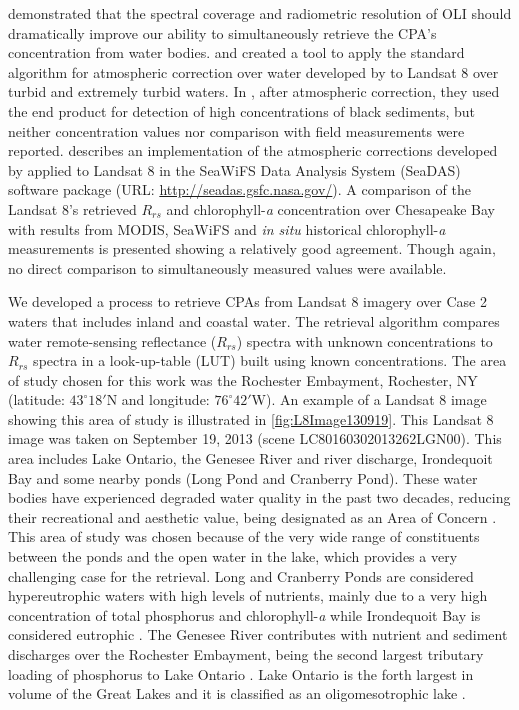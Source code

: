 \documentclass[onecolumn,3p,letterpaper]{elsarticle}
\begin{document}
\citet{Gerace:2013} demonstrated that the spectral coverage and radiometric resolution of OLI should dramatically improve our ability to simultaneously retrieve the CPA's concentration from water bodies. \citet{Vanhellemont2014} and \citet{Vanhellemont:2015} created a tool to apply the standard algorithm for atmospheric correction over water developed by \citet{Gordon:1994} to Landsat 8 over turbid and extremely turbid waters. In \citet{Vanhellemont:2015}, after atmospheric correction, they used the end product for detection of high concentrations of black sediments, but neither concentration values nor comparison with field measurements were reported. \citet{Franz:2015} describes an implementation of the atmospheric corrections developed by \citet{Gordon:1994} applied to Landsat 8 in the SeaWiFS Data Analysis System (SeaDAS) software package (URL: \url{http://seadas.gsfc.nasa.gov/}). A comparison of the Landsat 8's retrieved $R_{rs}$ and chlorophyll-{\it a} concentration over Chesapeake Bay with results from MODIS, SeaWiFS and {\it in situ} historical chlorophyll-{\it a} measurements is presented showing a relatively good agreement. Though again, no direct comparison to simultaneously measured values were available.


We developed a process to retrieve CPAs from Landsat 8 imagery over Case 2 waters that includes inland and coastal water. The retrieval algorithm compares water remote-sensing reflectance ($R_{rs}$) spectra with unknown concentrations to $R_{rs}$ spectra in a look-up-table (LUT) built using known concentrations. The area of study chosen for this work was the Rochester Embayment, Rochester, NY (latitude: $43^\circ18'$N and longitude: $76^\circ42'$W). An example of a Landsat 8 image showing this area of study is illustrated in \autoref{fig:L8Image130919}. This Landsat 8 image was taken on September 19, 2013 (scene LC80160302013262LGN00). This area includes Lake Ontario, the Genesee River and river discharge, Irondequoit Bay and some nearby ponds (Long Pond and Cranberry Pond). These water bodies have experienced degraded water quality in the past two decades, reducing their recreational and aesthetic value, being designated as an Area of Concern \citep{Makarewicz2010}. This area of study was chosen because of the very wide range of constituents between the ponds and the open water in the lake, which provides a very challenging case for the retrieval. Long and Cranberry Ponds are considered hypereutrophic waters with high levels of nutrients, mainly due to a very high concentration of total phosphorus and chlorophyll-{\it a} \citep{NYSDEC2010,Makarewicz1994} while Irondequoit Bay is considered eutrophic \citep{Makarewicz2010}. The Genesee River contributes with nutrient and sediment discharges over the Rochester Embayment, being the second largest tributary loading of phosphorus to Lake Ontario \citep{NYSDEC2015}. Lake Ontario is the forth largest in volume of the Great Lakes and it is classified as an oligomesotrophic lake \citep{IJC1980}. 
\end{document}
